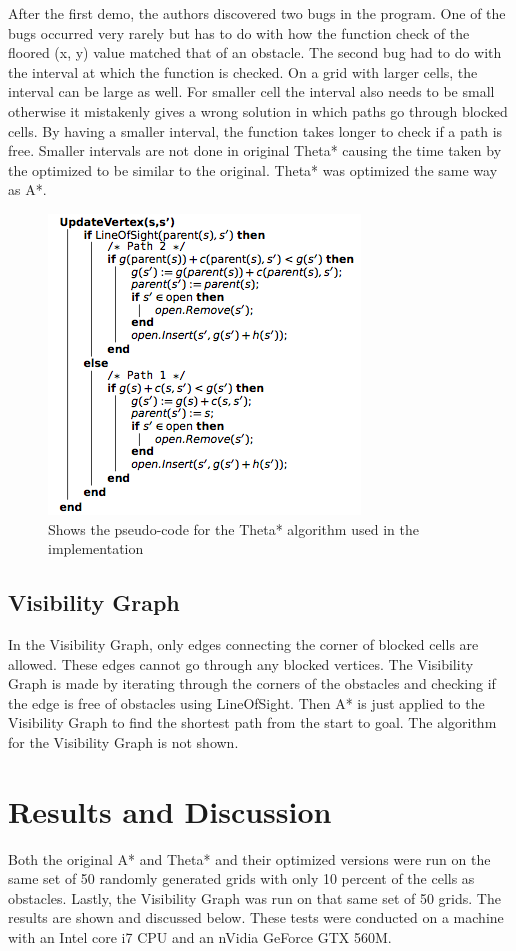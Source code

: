 \documentclass[a4paper,11pt]{report}
\begin{document}
	After the first demo, the authors discovered two bugs in the program. One of the bugs occurred very rarely but has to do with how the function check of the floored (x, y) value matched that of an obstacle. The second bug had to do with the interval at which the function is checked. On a grid with larger cells, the interval can be large as well. For smaller cell the interval also needs to be small otherwise it mistakenly gives a wrong solution in which paths go through blocked cells. By having a smaller interval, the function takes longer to check if a path is free. Smaller intervals are not done in original Theta* causing the time taken by the optimized to be similar to the original.  Theta* was optimized the same way as A*.

	\begin{figure}[h!]
	    \includegraphics[width=.5\textwidth]{images/theta_algorithm.png}
	  \caption{Shows the pseudo-code for the Theta* algorithm used in the implementation}
	  \label{fig:theta_algorithm}
	\end{figure}

	\subsection{Visibility Graph}
	In the Visibility Graph, only edges connecting the corner of blocked cells are allowed. These edges cannot go through any blocked vertices. The Visibility Graph is made by iterating through the corners of the obstacles and checking if the edge is free of obstacles using LineOfSight. Then A* is just applied to the Visibility Graph to find the shortest path from the start to goal. The algorithm for the Visibility Graph is not shown. 

\section{Results and Discussion}
Both the original A* and Theta* and their optimized versions were run on the same set of 50 randomly generated grids with only 10 percent of the cells as obstacles. Lastly, the Visibility Graph was run on that same set of 50 grids. The results are shown and discussed below.  These tests were conducted on a machine with an Intel core i7 CPU and an nVidia GeForce GTX 560M.
\end{document}
